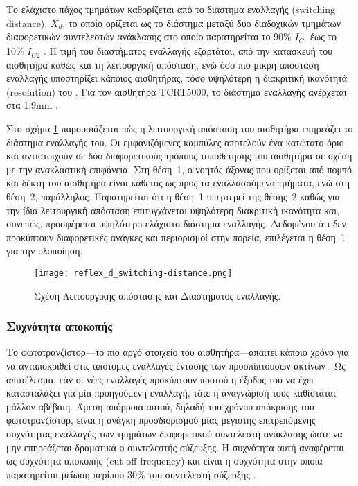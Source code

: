 Το ελάχιστο πάχος τμημάτων καθορίζεται από το διάστημα εναλλαγής (switching distance),
$X_d$, το οποίο ορίζεται ως το διάστημα μεταξύ δύο διαδοχικών τμημάτων
διαφορετικών συντελεστών ανάκλασης στο οποίο παρατηρείται το 90\% $I_{C_1}$ έως
το 10\% $I_{C2}$ \parencite{vishay06}. Η τιμή του διαστήματος εναλλαγής
εξαρτάται, από την κατασκευή του αισθητήρα καθώς και τη λειτουργική απόσταση,
ενώ όσο πιο μικρή απόσταση εναλλαγής υποστηρίζει κάποιος αισθητήρας, τόσο
υψηλότερη η διακριτική ικανότητά (resolution) του
\parencites{vishay02}{vishay06}. Για τον αισθητήρα TCRT5000, το διάστημα
εναλλαγής ανέρχεται στα 1.9mm \parencite{vishay02}.

Στο σχήμα \ref{fig:reflex:d_switching-distance} παρουσιάζεται πώς η λειτουργική
απόσταση του αισθητήρα επηρεάζει το διάστημα εναλλαγής του. Οι εμφανιζόμενες
καμπύλες αποτελούν ένα κατώτατο όριο και αντιστοιχούν σε δύο διαφορετικούς
τρόπους τοποθέτησης του αισθητήρα σε σχέση με την ανακλαστική επιφάνεια.
Στη θέση~1, ο νοητός άξονας που ορίζεται από πομπό και δέκτη του αισθητήρα είναι
κάθετος ως προς τα εναλλασσόμενα τμήματα, ενώ στη θέση~2, παράλληλος.
Παρατηρείται ότι η θέση~1 υπερτερεί της θέσης~2 καθώς για την ίδια λειτουργική
απόσταση επιτυγχάνεται υψηλότερη διακριτική ικανότητα και, συνεπώς, προσφέρεται
υψηλότερο ελάχιστο διάστημα εναλλαγής. Δεδομένου ότι δεν προκύπτουν διαφορετικές
ανάγκες και περιορισμοί στην πορεία, επιλέγεται η θέση~1 για την υλοποίηση.

\begin{figure}
    \caption{Σχέση Λειτουργικής απόστασης και Διαστήματος εναλλαγής.
    \label{fig:reflex:d_switching-distance}}
    \begin{center}%
    \texttt{[image: reflex\_d\_switching-distance.png]}%
    \end{center}

\end{figure}


\subsubsection{Συχνότητα αποκοπής}

Το φωτοτρανζίστορ---το πιο αργό στοιχείο του αισθητήρα---απαιτεί κάποιο χρόνο
για να ανταποκριθεί στις απότομες εναλλαγές έντασης των προσπίπτουσων ακτίνων
\parencite{vishay06}. Ως αποτέλεσμα, εάν οι νέες εναλλαγές προκύπτουν προτού η
έξοδος του να έχει κατασταλάξει για μία προηγούμενη εναλλαγή, τότε η αναγνώρισή
τους καθίσταται μάλλον αβέβαιη. Άμεση απόρροια αυτού, δηλαδή του χρόνου
απόκρισης του φωτοτρανζίστορ, είναι η ανάγκη προσδιορισμού μίας μέγιστης
επιτρεπόμενης συχνότητας εναλλαγής των τμημάτων διαφορετικού συντελεστή
ανάκλασης ώστε να μην επηρεάζεται δραματικά ο συντελεστής σύζευξης. Η συχνότητα
αυτή αναφέρεται ως συχνότητα αποκοπής 
(cut-off frequency) και είναι η συχνότητα στην οποία παρατηρείται μείωση
περίπου 30\% του συντελεστή σύζευξης \parencite{vishay02}.

